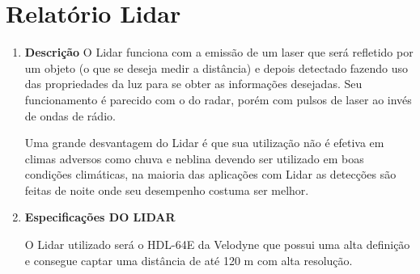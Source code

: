 \chapter[Relatório Lidar]{Relatório Lidar}
\begin{enumerate}
\item \textbf{Descrição}
O Lidar funciona com a emissão de um laser que será refletido por um objeto (o que se deseja medir a distância) e depois detectado fazendo uso das propriedades da luz para se obter as informações desejadas. Seu funcionamento é parecido com o do radar, porém com pulsos de laser ao invés de ondas de rádio.

Uma grande desvantagem do Lidar é que sua utilização não é efetiva em climas adversos como chuva e neblina devendo ser utilizado em boas condições climáticas, na maioria das aplicações com Lidar as detecções são feitas de noite onde seu desempenho costuma ser melhor.

\item \textbf{Especificações DO LIDAR}

O Lidar utilizado será o HDL-64E da Velodyne que possui uma alta definição e consegue captar uma distância de até 120 m com alta resolução.


\end{enumerate}
